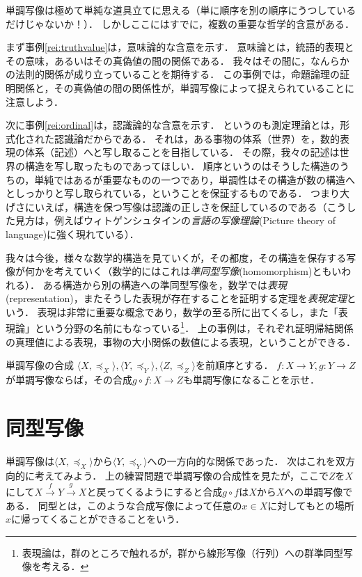 \documentclass[dvipdfmx,11pt,a4paper]{jsarticle}
\begin{document}
単調写像は極めて単純な道具立てに思える（単に順序を別の順序にうつしているだけじゃないか！）．
しかしここにはすでに，複数の重要な哲学的含意がある．

まず事例\ref{rei:truthvalue}は，意味論的な含意を示す．
意味論とは，統語的表現とその意味，あるいはその真偽値の間の関係である．
我々はその間に，なんらかの法則的関係が成り立っていることを期待する．
この事例では，命題論理の証明関係と，その真偽値の間の関係性が，単調写像によって捉えられていることに注意しよう．

次に事例\ref{rei:ordinal}は，認識論的な含意を示す．
というのも測定理論とは，形式化された認識論だからである．
それは，ある事物の体系（世界）を，数的表現の体系（記述）へと写し取ることを目指している．
その際，我々の記述は世界の構造を写し取ったものであってほしい．
順序というのはそうした構造のうちの，単純ではあるが重要なものの一つであり，単調性はその構造が数の構造へとしっかりと写し取られている，ということを保証するものである．
つまり大げさにいえば，構造を保つ写像は認識の正しさを保証しているのである（こうした見方は，例えばウィトゲンシュタインの\emph{言語の写像理論}(Picture theory of language)に強く現れている）．

我々は今後，様々な数学的構造を見ていくが，その都度，その構造を保存する写像が何かを考えていく（数学的にはこれは\emph{準同型写像}(homomorphism)ともいわれる）．
ある構造から別の構造への準同型写像を，数学では\emph{表現}(representation)，またそうした表現が存在することを証明する定理を\emph{表現定理}という．
表現は非常に重要な概念であり，数学の至る所に出てくるし，また「表現論」という分野の名前にもなっている\footnote{表現論は，群のところで触れるが，群から線形写像（行列）への群準同型写像を考える．}．
上の事例は，それぞれ証明帰結関係の真理値による表現，事物の大小関係の数値による表現，ということができる．


\begin{renshu}{単調写像の合成}{}
$\langle X, \preceq_X \rangle, \langle Y, \preceq_Y \rangle, \langle Z, \preceq_Z \rangle$を前順序とする．
$f:X \to Y, g:Y \to Z$が単調写像ならば，その合成$g \circ f: X \to Z$も単調写像になることを示せ． 
\end{renshu}


\section{同型写像}
単調写像は$\langle X, \preceq_X \rangle$から$\langle Y, \preceq_Y \rangle$への一方向的な関係であった．
次はこれを双方向的に考えてみよう．
上の練習問題で単調写像の合成性を見たが，ここで$Z$を$X$にして$X \xrightarrow{f} Y \xrightarrow{g} X$と戻ってくるようにすると合成$g \circ f$は$X$から$X$への単調写像である．
同型とは，このような合成写像によって任意の$x \in X$に対してもとの場所$x$に帰ってくることができることをいう．
\end{document}
